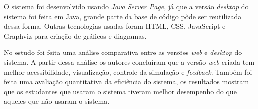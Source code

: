 O sistema foi desenvolvido usando \textit{Java Server Page}, já que a versão \textit{desktop} do sistema foi feita em Java, grande parte da base de código pôde ser reutilizada dessa forma. Outras tecnologias usadas foram HTML, CSS, JavaScript e Graphviz para criação de gráficos e diagramas.

No estudo foi feita uma análise comparativa entre as versões \textit{web} e \textit{desktop} do sistema. A partir dessa análise os autores concluíram que a versão \textit{web} criada tem melhor acessibilidade, visualização, controle da simulação e \textit{feedback}. Também foi feita uma avaliação quantitativa da eficiência do sistema, os resultados mostram que os estudantes que usaram o sistema tiveram melhor desempenho do que aqueles que não usaram o sistema.




